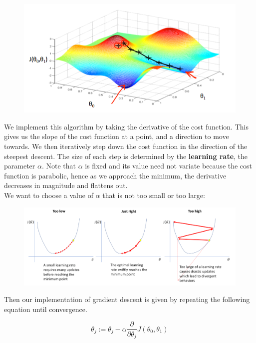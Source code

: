 \begin{figure}[hbt!]
    \centering
    \includegraphics[scale=0.75]{Resources/Gradient_Descent}
\end{figure}

\noindent We implement this algorithm by taking the derivative of the cost function. This gives us the
slope of the cost function at a point, and a direction to move towards. We then iteratively step down
the cost function in the direction of the steepest descent. The size of each step is determined by the
\textbf{learning rate}, the parameter $\alpha$. Note that $\alpha$ is fixed and its value need not variate
because the cost function is parabolic, hence as we approach the minimum, the derivative decreases in
magnitude and flattens out. \\

\noindent We want to choose a value of $\alpha$ that is not too small or too large:

\begin{figure}[hbt!]
    \centering
    \includegraphics[scale=0.5]{Resources/Learning_Rate.PNG}
\end{figure}

\noindent Then our implementation of gradient descent is given by repeating the following equation until
convergence.

\begin{equation*}
    \theta_j := \theta_j-\alpha\frac{\partial}{\partial \theta_j}J(\theta_0,\theta_1)
\end{equation*}

